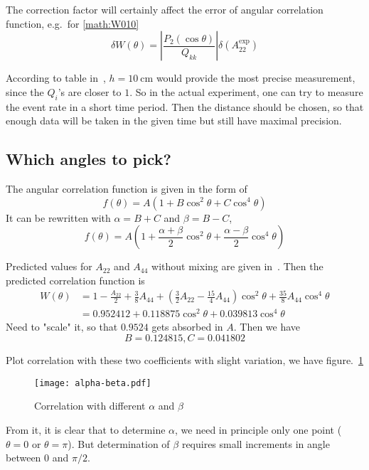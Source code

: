 The correction factor will certainly affect the error of angular correlation function, e.g.~for \eqref{math:W010}
\begin{equation}
   \delta W(\theta) = \left| \frac{P_2 (\cos\theta)}{Q_{kk}} \right| \delta (A_{22}^\text{exp})
\end{equation}

According to table in~\cite{siegbahn}, $h=\SI{10}{\cm}$ would provide the most precise measurement, since the $Q_i$'s are closer to $1$. So in the actual experiment, one can try to measure the event rate in a short time period. Then the distance should be chosen, so that enough data will be taken in the given time but still have maximal precision.

\subsection{Which angles to pick?}
The angular correlation function is given in the form of~\cite{descr}
\begin{equation}
   f(\theta) = A(1 + B \cos^2\theta + C \cos^4 \theta)
\end{equation}
It can be rewritten with $\alpha= B + C$ and $\beta = B-C$,
\begin{equation}
   f(\theta) = A \left( 1 + \frac{\alpha + \beta}{ 2} \cos^2\theta + \frac{\alpha-\beta}{2} \cos^4 \theta \right)
\end{equation}

Predicted values for $A_{22}$ and $A_{44}$ without mixing are given in~\cite{siegbahn}. Then the predicted correlation function is
\begin{align}
   W(\theta) &= 1 - \frac{A_{22}}{2} + \frac{3}{8} A_{44} + \left( \frac{3}{2} A_{22} - \frac{15}{4} A_{44} \right) \cos^2 \theta + \frac{35}{8} A_{44} \cos^4 \theta \\
   &= 0.952412 + 0.118875 \cos^2 \theta + 0.039813 \cos^4 \theta
\end{align}
Need to "scale" it, so that $0.9524$ gets absorbed in $A$. Then we have
\begin{equation}
   B=0.124815, C=0.041802
\end{equation}

Plot correlation with these two coefficients with slight variation, we have figure.~\ref{fig:alpha-beta}
\begin{figure}[ht]
   \centering
   \texttt{[image: alpha-beta.pdf]}
   \caption{Correlation with different $\alpha$ and $\beta$}%
   \label{fig:alpha-beta}
\end{figure}
From it, it is clear that to determine $\alpha$, we need in principle only one point ($\theta=0$ or $\theta=\pi$). But determination of $\beta$  requires small increments in angle between $0$ and $\pi/2$.
